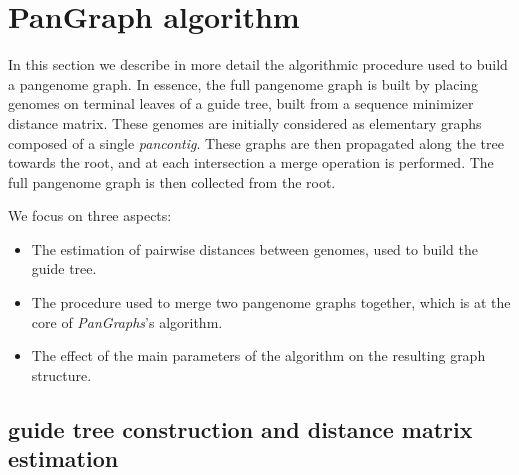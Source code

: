 \documentclass[aps,rmp,reprint,superscriptaddress,notitlepage,10pt,onecolumn]{revtex4-1}
\begin{document}
\section{PanGraph algorithm}
\label{sec:pangraph-algo}

In this section we describe in more detail the algorithmic procedure used to build a pangenome graph. In essence, the full pangenome graph is built by placing genomes on terminal leaves of a guide tree, built from a sequence minimizer distance matrix. These genomes are initially considered as elementary graphs composed of a single \textit{pancontig}. These graphs are then propagated along the tree towards the root, and at each intersection a merge operation is performed. The full pangenome graph is then collected from the root.

We focus on three aspects:
\begin{itemize}
    \item The estimation of pairwise distances between genomes, used to build the guide tree.
    \item The procedure used to merge two pangenome graphs together, which is at the core of \textit{PanGraphs}'s algorithm.
    \item The effect of the main parameters of the algorithm on the resulting graph structure.
\end{itemize}

\subsection{guide tree construction and distance matrix estimation}
\end{document}
